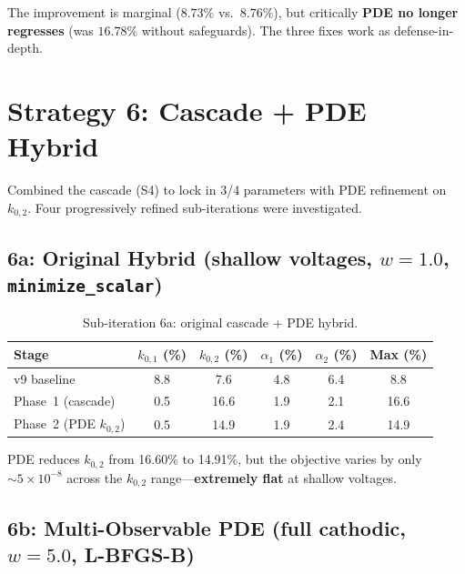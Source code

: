 \documentclass[11pt]{article}
\begin{document}
The improvement is marginal ($8.73\%$ vs.\ $8.76\%$), but critically
\textbf{PDE no longer regresses} (was $16.78\%$ without safeguards).  The
three fixes work as defense-in-depth.


\section{Strategy 6: Cascade + PDE Hybrid}

Combined the cascade (S4) to lock in 3/4 parameters with PDE refinement on
$k_{0,2}$.  Four progressively refined sub-iterations were investigated.

\subsection{6a: Original Hybrid (shallow voltages, $w = 1.0$, \texttt{minimize\_scalar})}

\begin{table}[htbp]
  \centering
  \caption{Sub-iteration 6a: original cascade + PDE hybrid.}
  \label{tab:s6a}
  \begin{tabular}{l S[round-precision=1] S[round-precision=1]
                    S[round-precision=1] S[round-precision=1]
                    S[round-precision=1]}
    \toprule
    Stage & {$k_{0,1}$ (\%)} & {$k_{0,2}$ (\%)}
          & {$\alpha_1$ (\%)} & {$\alpha_2$ (\%)}
          & {Max (\%)} \\
    \midrule
    v9 baseline             &  8.8 &  7.6 &  4.8 &  6.4 &  8.8 \\
    Phase~1 (cascade)       &  0.5 & 16.6 &  1.9 &  2.1 & 16.6 \\
    Phase~2 (PDE $k_{0,2}$) &  0.5 & 14.9 &  1.9 &  2.4 & 14.9 \\
    \bottomrule
  \end{tabular}
\end{table}

PDE reduces $k_{0,2}$ from 16.60\% to 14.91\%, but the objective varies by
only ${\sim}5 \times 10^{-8}$ across the $k_{0,2}$ range---\textbf{extremely
flat} at shallow voltages.

\subsection{6b: Multi-Observable PDE (full cathodic, $w = 5.0$, L-BFGS-B)}
\end{document}
